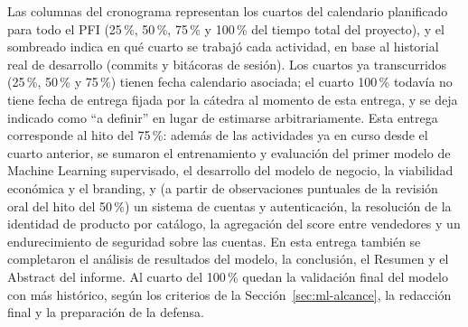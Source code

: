 \label{anexo:cronograma}

Las columnas del cronograma representan los cuartos del calendario planificado para todo el PFI (25\,\%, 50\,\%, 75\,\% y 100\,\% del tiempo total del proyecto), y el sombreado indica en qué cuarto se trabajó cada actividad, en base al historial real de desarrollo (commits y bitácoras de sesión). Los cuartos ya transcurridos (25\,\%, 50\,\% y 75\,\%) tienen fecha calendario asociada; el cuarto 100\,\% todavía no tiene fecha de entrega fijada por la cátedra al momento de esta entrega, y se deja indicado como ``a definir'' en lugar de estimarse arbitrariamente. Esta entrega corresponde al hito del 75\,\%: además de las actividades ya en curso desde el cuarto anterior, se sumaron el entrenamiento y evaluación del primer modelo de Machine Learning supervisado, el desarrollo del modelo de negocio, la viabilidad económica y el branding, y (a partir de observaciones puntuales de la revisión oral del hito del 50\,\%) un sistema de cuentas y autenticación, la resolución de la identidad de producto por catálogo, la agregación del score entre vendedores y un endurecimiento de seguridad sobre las cuentas. En esta entrega también se completaron el análisis de resultados del modelo, la conclusión, el Resumen y el Abstract del informe. Al cuarto del 100\,\% quedan la validación final del modelo con más histórico, según los criterios de la Sección~\ref{sec:ml-alcance}, la redacción final y la preparación de la defensa.

\newcommand{\avance}{\cellcolor{black!75}}

